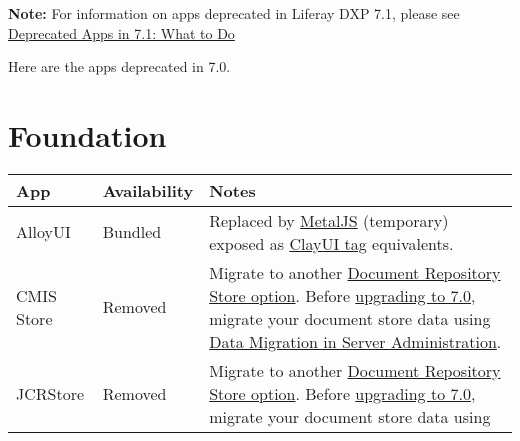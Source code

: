 \noindent\hrulefill

\noindent\hrulefill

\textbf{Note:} For information on apps deprecated in Liferay DXP 7.1,
please see
\href{/docs/7-1/deploy/-/knowledge_base/d/deprecated-apps-in-7-1-what-to-do}{Deprecated
Apps in 7.1: What to Do}

\noindent\hrulefill

Here are the apps deprecated in 7.0.

\section{Foundation}\label{foundation}

\noindent\hrulefill

\begin{longtable}[]{@{}
  >{\raggedright\arraybackslash}p{}
  >{\raggedright\arraybackslash}p{}
  >{\raggedright\arraybackslash}p{}@{}}
\toprule\noalign{}
\begin{minipage}[b]{\linewidth}\raggedright
App
\end{minipage} & \begin{minipage}[b]{\linewidth}\raggedright
Availability
\end{minipage} & \begin{minipage}[b]{\linewidth}\raggedright
Notes
\end{minipage} \\
\midrule\noalign{}
\endhead
\bottomrule\noalign{}
\endlastfoot
AlloyUI & Bundled & Replaced by \href{https://metaljs.com/}{MetalJS}
(temporary) exposed as
\href{/docs/7-2/reference/-/knowledge_base/r/front-end-taglibs}{ClayUI
tag} equivalents. \\
CMIS Store & Removed & Migrate to another
\href{/docs/7-2/deploy/-/knowledge_base/d/document-repository-configuration}{Document
Repository Store option}. Before
\href{/docs/7-2/deploy/-/knowledge_base/d/upgrading-to-product-ver}{upgrading
to 7.0}, migrate your document store data using
\href{/docs/7-2/user/-/knowledge_base/u/server-administration}{Data
Migration in Server Administration}. \\
JCRStore & Removed & Migrate to another
\href{/docs/7-2/deploy/-/knowledge_base/d/document-repository-configuration}{Document
Repository Store option}. Before
\href{/docs/7-2/deploy/-/knowledge_base/d/upgrading-to-product-ver}{upgrading
to 7.0}, migrate your document store data using

\end{longtable}
